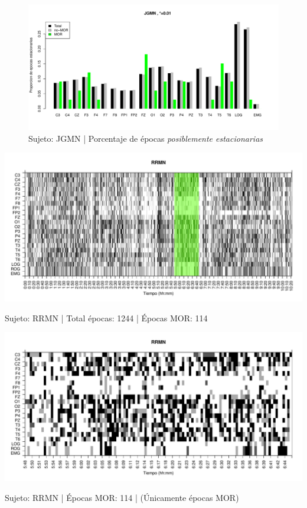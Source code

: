 \begin{figure}
\centering
\includegraphics[width=\linewidth]
{./material_bonito170220/porcentaje_bis/JGMN6SUE_33_1207_1_bar_porcentaje.pdf} 
\caption{Sujeto: JGMN | Porcentaje de \'epocas \textit{posiblemente estacionarias}}
\end{figure}


\begin{SidewaysFigure}
\centering
\includegraphics[width=\linewidth]
{./material_bonito170220/RRMNS_114_mor114_tot1244_est_total_bis.pdf} 
\caption{Sujeto: RRMN | Total \'epocas: 1244 | \'Epocas MOR: 114}
\end{SidewaysFigure}
\begin{SidewaysFigure}
\centering
\includegraphics[width=\linewidth]
{./material_bonito170220/RRMNS_114_mor114_tot114_est_mor_bis.pdf} 
\caption{Sujeto: RRMN | \'Epocas MOR: 114 | (\'Unicamente \'epocas MOR)}
\end{SidewaysFigure}

